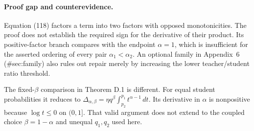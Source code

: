 \documentclass[10pt]{article}
\begin{document}
\paragraph*{Proof gap and counterevidence.}\mbox{}\par
Equation (118) factors a term into two factors with opposed monotonicities. The proof does not establish the required sign for the derivative of their product. Its positive-factor branch compares with the endpoint \(\alpha=1\), which is insufficient for the asserted ordering of every pair \(\alpha_1<\alpha_2\). An optional family in Appendix 6 (\#sec:family) also rules out repair merely by increasing the lower teacher/student ratio threshold.\par
The fixed-\(\beta\) comparison in Theorem D.1 is different. For equal student probabilities it reduces to \(\Delta_{\alpha,\beta}=\eta q^\beta\int_{p_2}^{p_1}t^{\alpha-1}\,dt\). Its derivative in \(\alpha\) is nonpositive because \(\log t\le0\) on \((0,1]\). That valid argument does not extend to the coupled choice \(\beta=1-\alpha\) and unequal \(q_1,q_2\) used here.\par
\end{document}
